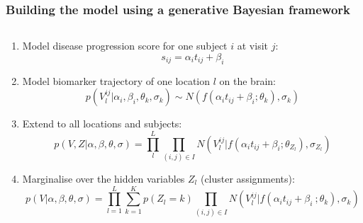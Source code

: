 \begin{frame}
\frametitle{Building the model using a generative Bayesian framework}

\begin{columns}[T]
    \begin{column}{.7\textwidth} %
   
     
   \begin{enumerate}      
      
       \item Model disease progression score for one subject $i$ at visit $j$:
      $$s_{ij} = \alpha_i t_{ij} + \beta_i$$
      
      \vspace{1em}
      
       \item Model biomarker trajectory of one location $l$ on the brain:
       $$p(V_l^{ij} | \alpha_i, \beta_i, \theta_k, \sigma_k) \sim N(f(\alpha_i t_{ij} + \beta_i ; \theta_k), \sigma_k)$$
      
      \vspace{1em}
      
       \item Extend to all locations and subjects:
       $$  p(V, Z | \alpha, \beta, \theta, \sigma) = \prod_l^L \prod_{(i,j) \in I} N(V_l^{ij} | f(\alpha_i t_{ij} + \beta_i ; \theta_{Z_l}), \sigma_{Z_l}) $$

      \vspace{1em}
  
       \item Marginalise over the hidden variables $Z_l$ (cluster assignments):
       \small{$$p(V|\alpha, \beta, \theta, \sigma) = \prod_{l=1}^L \sum_{k=1}^K p(Z_l = k) \prod_{(i,j) \in I} N(V_l^{ij} | f(\alpha_i t_{ij} + \beta_i \ ; \theta_k), \sigma_k)$$}
     
     \end{enumerate}
     


\end{column}
\end{columns}
\end{frame}
